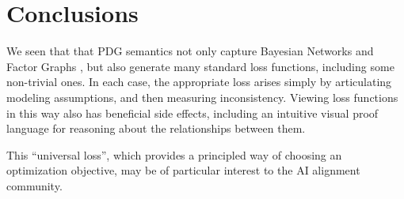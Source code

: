 \section{Conclusions}


We seen that that PDG semantics 
not only capture Bayesian Networks and Factor Graphs \parencite{pdg-aaai}, but also generate
many standard loss functions, including some non-trivial ones.
In each case, the appropriate loss arises simply by articulating modeling assumptions, and then measuring inconsistency.
Viewing loss functions in this way also has beneficial side effects, including an intuitive visual proof language for reasoning about the relationships between them.

This ``universal loss'',
which provides a principled way of choosing an optimization objective,
may be of particular interest to the AI alignment community.




